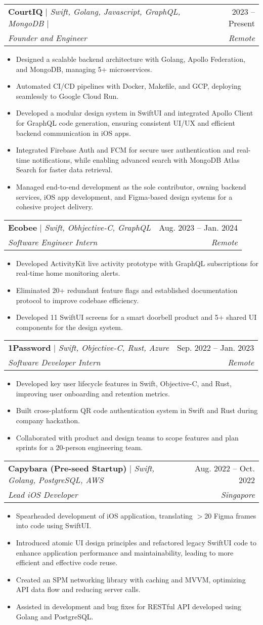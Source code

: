 \documentclass[letterpaper,11pt]{article}
\makeatletter
\newcommand{\resumeItem}[1]{
  \item\small{
    {#1 \vspace{-1pt}}  %
  }
}
\newcommand{\resumeSubheading}[4]{
  \vspace{-2pt}\item
    \begin{tabular*}{0.97\textwidth}[t]{l@{\extracolsep{\fill}}r}
      #1 & #2 \\  %
      \textit{\small#3} & \textit{\small #4} \\
    \end{tabular*}\vspace{-5pt}
}
\newcommand{\resumeItemListStart}{\begin{itemize}}
\newcommand{\resumeItemListEnd}{\end{itemize}\vspace{-5pt}}
\makeatother
\begin{document}
    \resumeSubheading
    {\textbf{CourtIQ} $|$ \emph{Swift, Golang, Javascript, GraphQL, MongoDB $|$ \href{https://github.com/CourtIQ/courtiq-ios}{\color{linkblue}\faGithub}
    }}{2023 -- Present}
    {Founder and Engineer}{Remote}
    \resumeItemListStart
    \resumeItem{Designed a scalable backend architecture with Golang, Apollo Federation, and MongoDB, managing 5+ microservices.}
    \resumeItem{Automated CI/CD pipelines with Docker, Makefile, and GCP, deploying seamlessly to Google Cloud Run.}
      \resumeItem{Developed a modular design system in SwiftUI and integrated Apollo Client for GraphQL code generation, ensuring consistent UI/UX and efficient backend communication in iOS apps.}      
      \resumeItem{Integrated Firebase Auth and FCM for secure user authentication and real-time notifications, while enabling advanced search with MongoDB Atlas Search for faster data retrieval.}
      \resumeItem{Managed end-to-end development as the sole contributor, owning backend services, iOS app development, and Figma-based design systems for a cohesive project delivery.}
    \resumeItemListEnd

    \resumeSubheading
      {\textbf{Ecobee} $|$ \emph{Swift, Obhjective-C, GraphQL}}{Aug. 2023 -- Jan. 2024}
      {Software Engineer Intern}{Remote}
      \resumeItemListStart
      \resumeItem{Developed ActivityKit live activity prototype with GraphQL subscriptions for real-time home monitoring alerts.}
      \resumeItem{Eliminated 20+ redundant feature flags and established documentation protocol to improve codebase efficiency.}
      \resumeItem{Developed 11 SwiftUI screens for a smart doorbell product and 5+ shared UI components for the design system.}
    \resumeItemListEnd
      
    \resumeSubheading
      {\textbf{1Password} $|$ \emph{Swift, Objective-C, Rust, Azure}}{Sep. 2022 -- Jan. 2023}
      {Software Developer Intern}{Remote}
      \resumeItemListStart
      \resumeItem{Developed key user lifecycle features in Swift, Objective-C, and Rust, improving user onboarding and retention metrics.}
      \resumeItem{Built cross-platform QR code authentication system in Swift and Rust during company hackathon.}
      \resumeItem{Collaborated with product and design teams to scope features and plan sprints for a 20-person engineering team.}
    \resumeItemListEnd
    
    \resumeSubheading
      {\textbf{Capybara (Pre-seed Startup)} $|$ \emph{Swift, Golang, PostgreSQL, AWS}}{Aug. 2022 -- Oct. 2022}
      {Lead iOS Developer}{Singapore}
      \resumeItemListStart
        \resumeItem{Spearheaded development of iOS application, translating $>$20 Figma frames into code using SwiftUI.}
        \resumeItem{Introduced atomic UI design principles and refactored legacy SwiftUI code to enhance application performance and maintainability, leading to more efficient and effective code reuse.}
        \resumeItem{Created an SPM networking library with caching and MVVM, optimizing API data flow and reducing server calls.}
        \resumeItem{Assisted in development and bug fixes for RESTful API developed using Golang and PostgreSQL.}
      \resumeItemListEnd
\end{document}
